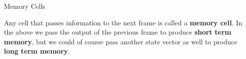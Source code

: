 \documentclass[10pt, table, dvipsnames,xcdraw, handout]{beamer}
\def\layersep{2.5cm}
\begin{document}
\begin{frame}[fragile]{Memory Cells}
\begin{minipage}[t][0.5\textheight][t]{\textwidth}
  \end{minipage}
  \vfill
\begin{minipage}[t][0.5\textheight][t]{\textwidth}
Any cell that passes information to the next frame is called a \textbf{memory cell}. In the above we pass the output of the previous frame to produce \textbf{short term memory}, but we could of course pass another state vector as well to produce \textbf{long term memory}. 
\end{minipage}
\end{frame}
\end{document}
